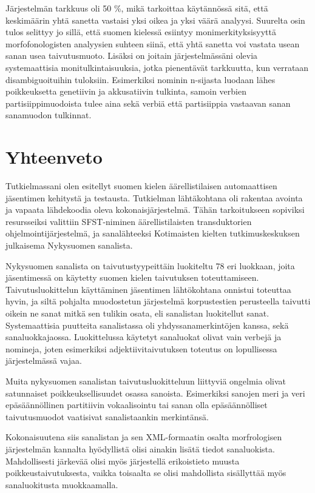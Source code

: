 \documentclass[free]{flammie}
\begin{document}
        Järjestelmän tarkkuus oli 50 \%, mikä tarkoittaa käytännössä sitä, että keskimäärin yhtä sanetta vastaisi yksi oikea ja yksi väärä analyysi. Suurelta osin tulos selittyy jo sillä, että suomen kielessä esiintyy monimerkityksisyyttä morfofonologisten analyysien suhteen siinä, että yhtä sanetta voi vastata usean sanan usea
taivutusmuoto. Lisäksi on joitain järjestelmässäni olevia systemaattisia monitulkintaisuuksia, jotka pienentävät tarkkuutta, kun verrataan disambiguoituihin tuloksiin. Esimerkiksi nominin n-sijasta luodaan lähes poikkeuksetta genetiivin ja
akkusatiivin tulkinta, samoin verbien partisiippimuodoista tulee aina sekä verbiä
että partisiippia vastaavan sanan sanamuodon tulkinnat.

\section{Yhteenveto}

Tutkielmassani olen esitellyt suomen kielen äärellistilaisen automaattisen jäsentimen kehitystä ja testausta. Tutkielman lähtäkohtana oli rakentaa avointa ja vapaata
lähdekoodia oleva kokonaisjärjestelmä. Tähän tarkoitukseen sopiviksi resursseiksi valittiin SFST-niminen äärellistilaisten transduktorien ohjelmointijärjestelmä,
ja sanalähteeksi Kotimaisten kielten tutkimuskeskuksen julkaisema Nykysuomen
sanalista.

Nykysuomen sanalista on taivutustyypeittäin luokiteltu 78 eri luokkaan, joita jäsentimessä on käytetty suomen kielen taivutuksen toteuttamiseen. Taivutusluokittelun käyttäminen jäsentimen lähtökohtana onnistui toteuttaa hyvin, ja siltä pohjalta muodostetun järjestelmä korpustestien perusteella taivutti oikein ne sanat
mitkä sen tulikin osata, eli sanalistan luokitellut sanat. Systemaattisia puutteita sanalistassa oli yhdyssanamerkintöjen kanssa, sekä sanaluokkajaossa. Luokittelussa
käytetyt sanaluokat olivat vain verbejä ja nomineja, joten esimerkiksi adjektiivitaivutuksen toteutus on lopullisessa järjestelmässä vajaa.

Muita nykysuomen sanalistan taivutusluokitteluun liittyviä ongelmia olivat satunnaiset poikkeuksellisuudet osassa sanoista. Esimerkiksi sanojen meri ja veri epäsäännöllinen partitiivin vokaalisointu tai sanan olla epäsäännölliset taivutusmuodot vaatisivat sanalistaankin merkintänsä.

Kokonaisuutena siis sanalistan ja sen XML-formaatin osalta morfrologisen järjestelmän kannalta hyödyllistä olisi ainakin lisätä tiedot sanaluokista. Mahdollisesti
järkevää olisi myös järjestellä erikoistieto muusta poikkeustaivutuksesta, vaikka
toisaalta se olisi mahdollista sisällyttää myös sanaluokitusta muokkaamalla.
\end{document}
